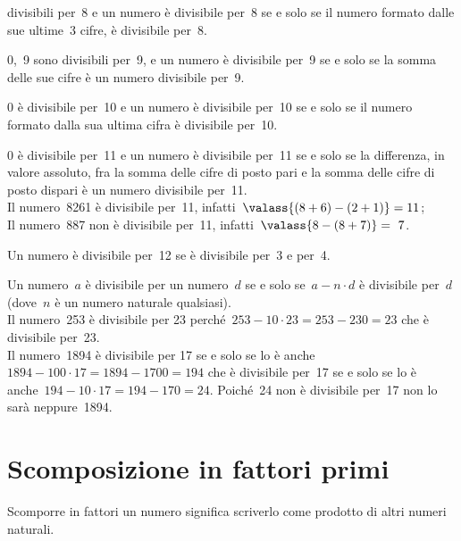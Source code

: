 \begin{description} [noitemsep]
divisibili per~8 
e un numero è divisibile per~8 se e solo se il numero formato dalle sue 
ultime~3 cifre, è divisibile per~8.
\item[\textbf{9}:~] 0,~9 sono divisibili per~9,
e un numero è divisibile per~9 se e solo se la somma delle sue cifre è un 
numero divisibile per~9.
\item[\textbf{10}:~] 0 è divisibile per~10 
e un numero è divisibile per~10 se e solo se il numero formato dalla sua 
ultima cifra è divisibile per~10.
\item[\textbf{11}:~] 0 è divisibile per~11
e un numero è divisibile per~11 se e solo se la differenza, 
in valore assoluto, fra la somma delle cifre di posto pari e la somma delle 
cifre di posto dispari è un numero divisibile per~11.\\
Il numero~8261 è divisibile per~11, 
infatti~\(\valass{(8+6)-(2+1)} = 11\);\\
Il numero~887 non è divisibile per~11, infatti~\(\valass{8-(8+7)}=~7\).
\item[\textbf{12}:~] Un numero è divisibile per~12 se è 
divisibile per~3 e per~4.
\item[\textbf{un numero qualunque}:~] Un numero~\(a\) è divisibile 
per un numero~\(d\) se e solo se~\(a - n \cdot d\) è divisibile per~\(d\) 
(dove~\(n\) è un numero naturale qualsiasi).\\
Il numero~253 è divisibile per 23 
perché~\(253 - 10 \cdot 23 = 253 - 230 = 23\) che è divisibile per~23.\\
Il numero~1894 è divisibile per 17 se e solo se lo è 
anche~\(1894 - 100 \cdot 17 = 1894 - 1700 = 194\) 
che è divisibile per~17 se e solo se lo è
anche~\(194 - 10 \cdot 17 = 194 - 170 = 24\). 
Poiché~24 non è divisibile per~17 non lo sarà neppure~1894.
\end{description}


\pagebreak %

\section{Scomposizione in fattori primi}
\label{sec:nat_scomposizione}

Scomporre in fattori un numero significa scriverlo come prodotto di altri 
numeri naturali. 


